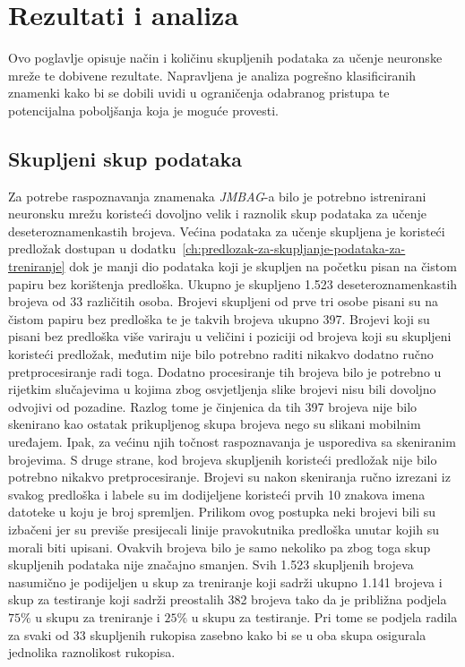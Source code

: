 \chapter{Rezultati i analiza}
\label{ch:rezultati-i-analiza}
Ovo poglavlje opisuje način i količinu skupljenih podataka za učenje neuronske mreže te dobivene rezultate. Napravljena
je analiza pogrešno klasificiranih znamenki kako bi se dobili uvidi u ograničenja odabranog pristupa te potencijalna
poboljšanja koja je moguće provesti.


\section{Skupljeni skup podataka}
\label{sec:skupljeni-skup-podataka}
Za potrebe raspoznavanja znamenaka \emph{JMBAG}-a bilo je potrebno istrenirani neuronsku mrežu koristeći dovoljno velik
i raznolik skup podataka za učenje deseteroznamenkastih brojeva. Većina podataka za učenje skupljena je koristeći
predložak dostupan u dodatku\ \ref{ch:predlozak-za-skupljanje-podataka-za-treniranje} dok je manji dio podataka koji je
skupljen na početku pisan na čistom papiru bez korištenja predloška. Ukupno je skupljeno 1.523 deseteroznamenkastih
brojeva od 33 različitih osoba. Brojevi skupljeni od prve tri osobe pisani su na čistom papiru bez predloška te je
takvih brojeva ukupno 397. Brojevi koji su pisani bez predloška više variraju u veličini i poziciji od brojeva koji su
skupljeni koristeći predložak, međutim nije bilo potrebno raditi nikakvo dodatno ručno pretprocesiranje radi toga.
Dodatno procesiranje tih brojeva bilo je potrebno u rijetkim slučajevima u kojima zbog osvjetljenja slike brojevi nisu
bili dovoljno odvojivi od pozadine. Razlog tome je činjenica da tih 397 brojeva nije bilo skenirano kao ostatak
prikupljenog skupa brojeva nego su slikani mobilnim uređajem. Ipak, za većinu njih točnost raspoznavanja je usporediva
sa skeniranim brojevima. S druge strane, kod brojeva skupljenih koristeći predložak nije bilo potrebno nikakvo
pretprocesiranje. Brojevi su nakon skeniranja ručno izrezani iz svakog predloška i labele su im dodijeljene koristeći
prvih 10 znakova imena datoteke u koju je broj spremljen. Prilikom ovog postupka neki brojevi bili su izbačeni jer su
previše presijecali linije pravokutnika predloška unutar kojih su morali biti upisani. Ovakvih brojeva bilo je samo
nekoliko pa zbog toga skup skupljenih podataka nije značajno smanjen. Svih 1.523 skupljenih brojeva nasumično je
podijeljen u skup za treniranje koji sadrži ukupno 1.141 brojeva i skup za testiranje koji sadrži preostalih 382 brojeva
tako da je približna podjela $75\%$ u skupu za treniranje i $25\%$ u skupu za testiranje. Pri tome se podjela radila za
svaki od 33 skupljenih rukopisa zasebno kako bi se u oba skupa osigurala jednolika raznolikost rukopisa.


